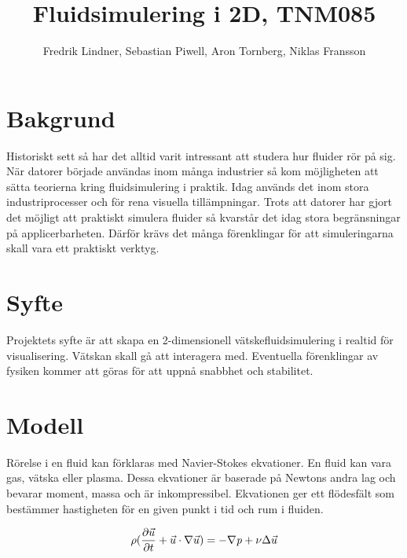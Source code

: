 \documentclass[a4paper,12pt,oneside,final]{extarticle}
\author{Fredrik Lindner, Sebastian Piwell, Aron Tornberg, Niklas Fransson}
\title{Fluidsimulering i 2D, TNM085}
\begin{document}
\maketitle


\clearpage
\tableofcontents
\clearpage

\section{Bakgrund}
Historiskt sett så har det alltid varit intressant att studera hur fluider rör på sig.
När datorer började användas inom många industrier så kom möjligheten att sätta teorierna kring fluidsimulering i praktik.
Idag används det inom stora industriprocesser och för rena visuella tillämpningar.
Trots att datorer har gjort det möjligt att praktiskt simulera fluider så kvarstår det idag stora begränsningar på applicerbarheten.
Därför krävs det många förenklingar för att simuleringarna skall vara ett praktiskt verktyg.

\section{Syfte}
Projektets syfte är att skapa en 2-dimensionell vätskefluidsimulering i realtid för visualisering.
Vätskan skall gå att interagera med.
Eventuella förenklingar av fysiken kommer att göras för att uppnå snabbhet och stabilitet.

\clearpage

\section{Modell}
Rörelse i en fluid kan förklaras med Navier-Stokes ekvationer.
En fluid kan vara gas, vätska eller plasma.
Dessa ekvationer är baserade på Newtons andra lag och bevarar moment, massa och är inkompressibel.
Ekvationen ger ett flödesfält som bestämmer hastigheten för en given punkt i tid och rum i fluiden.



\begin{equation} \label{eq:navier-stokes-1}
\rho(\frac{\partial \vec{u}}{\partial t} + \vec{u} \cdot \nabla \vec{u}) =  -\nabla {\it p} + \nu \Delta \vec{u}
\end{equation}
\end{document}

